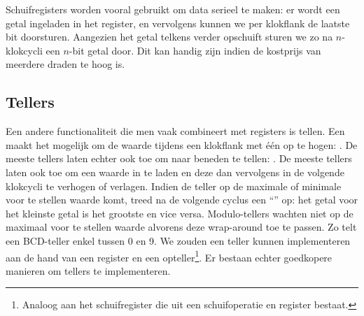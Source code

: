 Schuifregisters worden vooral gebruikt om data serieel te maken: er wordt een getal ingeladen in het register, en vervolgens kunnen we per klokflank de laatste bit doorsturen. Aangezien het getal telkens verder opschuift sturen we zo na $n$-klokcycli een $n$-bit getal door. Dit kan handig zijn indien de kostprijs van meerdere draden te hoog is.
\subsection{Tellers}
\label{ss:counters}
Een andere functionaliteit die men vaak combineert met registers is tellen. Een  maakt het mogelijk om de waarde tijdens een klokflank met \'e\'en op te hogen: . De meeste tellers laten echter ook toe om naar beneden te tellen: . De meeste tellers laten ook toe om een waarde in te laden en deze dan vervolgens in de volgende klokcycli te verhogen of verlagen. Indien de teller op de maximale of minimale voor te stellen waarde komt, treed na de volgende cyclus een ``'' op: het getal voor het kleinste getal is het grootste en vice versa. Modulo-tellers wachten niet op de maximaal voor te stellen waarde alvorens deze wrap-around toe te passen. Zo telt een BCD-teller enkel tussen 0 en 9. We zouden een teller kunnen implementeren aan de hand van een register en een opteller\footnote{Analoog aan het schuifregister die uit een schuifoperatie en register bestaat.}. Er bestaan echter goedkopere manieren om tellers te implementeren.
